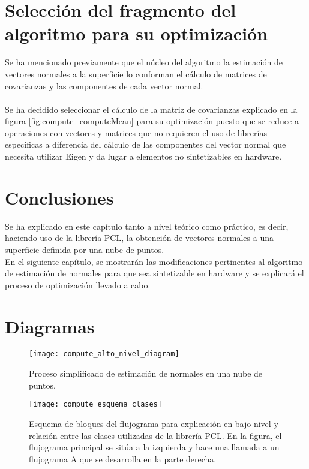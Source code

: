 \section{Selección del fragmento del algoritmo para su optimización}
Se ha mencionado previamente que el núcleo del algoritmo la estimación de vectores normales a la superficie lo conforman el cálculo de matrices de covarianzas y las componentes de cada vector normal.
\\
\\
Se ha decidido seleccionar el cálculo de la matriz de covarianzas explicado en la figura \ref{fig:compute_computeMean} para su optimización puesto que se reduce a operaciones con vectores y matrices que no requieren el uso de librerías específicas a diferencia del cálculo de las componentes del vector normal que necesita utilizar Eigen y da lugar a elementos no sintetizables en hardware. 

\section{Conclusiones}

Se ha explicado en este capítulo tanto a nivel teórico como práctico, es decir, haciendo uso de la librería PCL, la obtención de vectores normales a una superficie definida por una nube de puntos.
\\
En el siguiente capítulo, se mostrarán las modificaciones pertinentes al algoritmo de estimación de normales para que sea sintetizable en hardware y se explicará el proceso de optimización llevado a cabo.

\section{Diagramas}

\begin{figure}[!htb]
\centering
{}
  \texttt{[image: compute\_alto\_nivel\_diagram]}
  \caption{Proceso simplificado de estimación de normales en una nube de puntos.}\label{fig:compute_alto_nivel_diagram}
\endminipage\hfill
\end{figure}


\begin{figure}[h!]
\centering
\texttt{[image: compute\_esquema\_clases]}
\caption{Esquema de bloques del flujograma para explicación en bajo nivel y relación entre las clases utilizadas de la librería PCL. En la figura, el flujograma principal se sitúa a la izquierda y hace una llamada a un flujograma A que se desarrolla en la parte derecha.}\label{fig:compute_esquema_clases}
\end{figure}

